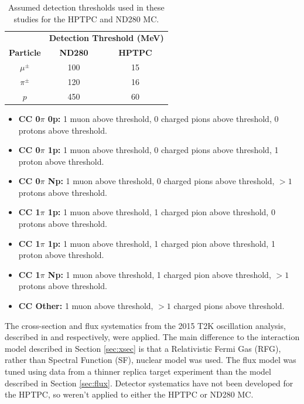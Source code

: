 \begin{center}
\begin{table}[!htpb]
\center
\begin{tabular}{c ||c c}
\hline \hline
 & \multicolumn{2}{c}{\textbf{Detection Threshold (MeV)}}\\
\textbf{Particle} & \textbf{ND280} & \textbf{HPTPC} \\
 \hline \hline
$\mu^{\pm}$ & 100 & 15 \\
$\pi^{\pm}$ & 120 & 16 \\
$p$ & 450 & 60 \\
\hline \hline
\end{tabular}
\caption{Assumed detection thresholds used in these studies for the HPTPC and ND280 MC.}
\label{tab:hptpcthresh}
\end{table}
\end{center}

\vspace{-1cm}
\begin{itemize}

\item \textbf{CC 0$\pi$ 0p:} 1 muon above threshold, 0 charged pions above threshold, 0 protons above threshold.

\item \textbf{CC 0$\pi$ 1p:} 1 muon above threshold, 0 charged pions above threshold, 1 proton above threshold.

\item \textbf{CC 0$\pi$ Np:} 1 muon above threshold, 0 charged pions above threshold, $>1$ protons above threshold.

\item \textbf{CC 1$\pi$ 1p:} 1 muon above threshold, 1 charged pion above threshold, 0 protons above threshold.

\item \textbf{CC 1$\pi$ 1p:} 1 muon above threshold, 1 charged pion above threshold, 1 proton above threshold.

\item \textbf{CC 1$\pi$ Np:} 1 muon above threshold, 1 charged pion above threshold, $>1$ protons above threshold.

\item \textbf{CC Other:} 1 muon above threshold, $>1$ charged pions above threshold.

\end{itemize}

The cross-section and flux systematics from the 2015 T2K oscillation analysis, described in \cite{tn265} and \cite{tn217} respectively, were applied. The main difference to the interaction model described in Section \ref{sec:xsec} is that a Relativistic Fermi Gas (RFG), rather than Spectral Function (SF), nuclear model was used. The flux model was tuned using data from a thinner replica target experiment than the model described in Section \ref{sec:flux}. Detector systematics have not been developed for the HPTPC, so weren't applied to either the HPTPC or ND280 MC.

